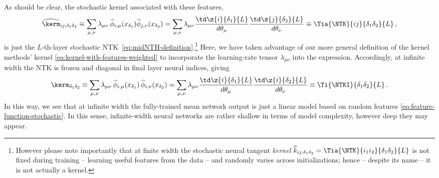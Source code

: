 As should be clear, the stochastic kernel associated with these features,
\begin{align}\label{eq:stochastic-kernel-ntk}
\widehat{\kerm}_{ij;\delta_1\delta_2}\equiv  \sum_{\mu,\nu}\lambda_{\mu\nu} \, \widehat{\phi}_{i,\mu}(x_{\delta_1}) \widehat{\phi}_{j,\nu}(x_{\delta_2})=\sum_{\mu,\nu}\lambda_{\mu\nu}\frac{\td \z{i}{\delta_1}{L}}{d \theta_\mu}\frac{\td \z{j}{\delta_2}{L}}{d \theta_\nu} \equiv \Tia{\NTK}{ij}{\delta_1\delta_2}{L}\, ,
\end{align}
is just the $L$-th-layer stochastic NTK~\eqref{eq:midNTH-definition}.\footnote{
    However please note importantly that at finite width the stochastic neural tangent \emph{kernel} $\widehat{k}_{ij;\delta_1\delta_2}=\Tia{\NTK}{i_1i_2}{\delta_1\delta_2}{L}$ is not fixed during training -- learning useful features from the data -- and randomly varies across initializations; hence  -- despite its name -- it is not actually a kernel.} Here, we have taken advantage of our more general definition of the kernel methods' kernel \eqref{eq:kernel-with-features-weighted} to incorporate the learning-rate tensor $\lambda_{\mu\nu}$ into the expression. Accordingly, at infinite width the NTK is frozen and diagonal in final layer neural indices, giving
\begin{align}
\kerm_{\delta_1\delta_2}\equiv  \sum_{\mu,\nu}\lambda_{\mu\nu} \, \widehat{\phi}_{i,\mu}(x_{\delta_1}) \, \widehat{\phi}_{i,\nu}(x_{\delta_2})=\sum_{\mu,\nu}\lambda_{\mu\nu}\frac{\td \z{i}{\delta_1}{L}}{d \theta_\mu}\frac{\td \z{i}{\delta_2}{L}}{d \theta_\nu}\equiv \Ti{\NTKI}{\delta_1\delta_2}{L} \, .
\end{align}
In this way, we see that at infinite width the fully-trained mean network output is just a linear model based on random features \eqref{eq:feature-function-stochastic}.
In this sense, infinite-width neural networks are rather shallow in terms of model complexity, however deep they may appear.


